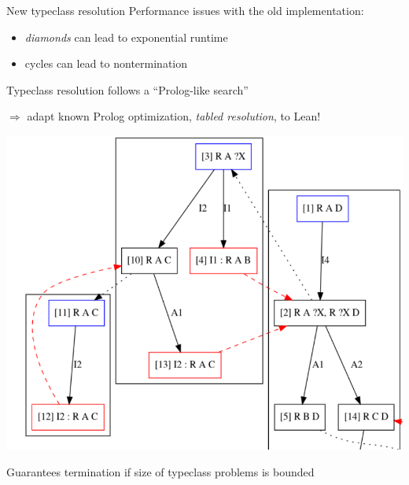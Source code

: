\documentclass[t]{beamer}
\begin{document}
\begin{frame}{New typeclass resolution}
  Performance issues with the old implementation:
  \begin{itemize}
  \item \emph{diamonds} can lead to exponential runtime
  \item cycles can lead to nontermination
  \end{itemize}
  \pause
  \bigskip

  Typeclass resolution follows a ``Prolog-like search''
  \pause
  
  $\Rightarrow$ adapt known Prolog optimization, \emph{tabled resolution}, to Lean!
  
  \begin{center}
    \includegraphics[height=0.5\textheight]{resolv}
  \end{center}

  Guarantees termination if size of typeclass problems is bounded
\end{frame}

%
\end{document}
